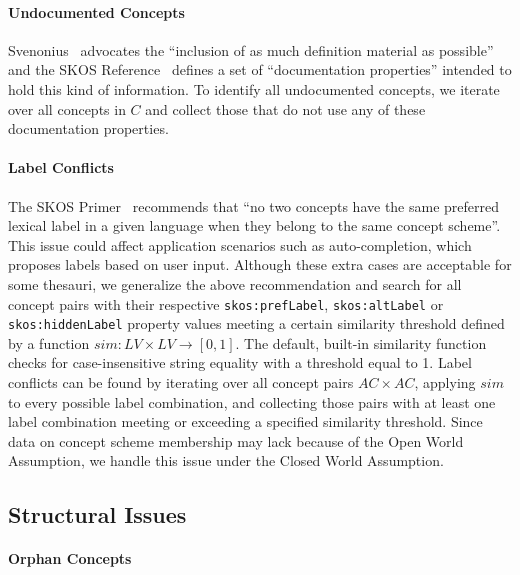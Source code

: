 \paragraph{Undocumented Concepts}

Svenonius~\cite{Svenonius1997} advocates the ``inclusion of as much definition material as possible'' and the SKOS Reference~\cite{SkosReference2008} defines a set of ``documentation properties'' intended to hold this kind of information.
To identify all undocumented concepts, we iterate over all concepts in $C$ and collect those that do not use any of these documentation properties.

\paragraph{Label Conflicts}

The SKOS Primer~\cite{Isaac2009} recommends that ``no two concepts have the same preferred lexical label in a given language when they belong to the same concept scheme''. This issue could affect application scenarios such as auto-completion, which proposes labels based on user input. Although these extra cases are acceptable for some thesauri, we generalize the above recommendation and search for all concept pairs with their respective \texttt{skos:prefLabel}, \texttt{skos:altLabel} or \texttt{skos:hiddenLabel} property values meeting a certain similarity threshold defined by a function $sim:LV \times LV \rightarrow [0,1]$.
The default, built-in similarity function checks for case-insensitive string equality with a threshold equal to 1. Label conflicts can be found by iterating over all concept pairs $AC \times AC$, applying $sim$ to every possible label combination, and collecting those pairs with at least one label combination meeting or exceeding a specified similarity threshold. Since data on concept scheme membership may lack because of the Open World Assumption, we handle this issue under the Closed World Assumption.


\subsection{Structural Issues}

\paragraph{Orphan Concepts}

